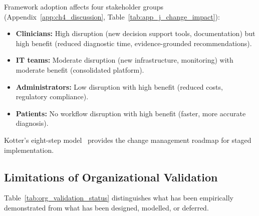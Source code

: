 Framework adoption affects four stakeholder groups (Appendix~\ref{app:ch4_discussion}, Table~\ref{tab:app_j_change_impact}):

\begin{itemize}
    \item \textbf{Clinicians:} High disruption (new decision support tools, documentation) but high benefit (reduced diagnostic time, evidence-grounded recommendations).
    \item \textbf{IT teams:} Moderate disruption (new infrastructure, monitoring) with moderate benefit (consolidated platform).
    \item \textbf{Administrators:} Low disruption with high benefit (reduced costs, regulatory compliance).
    \item \textbf{Patients:} No workflow disruption with high benefit (faster, more accurate diagnosis).
\end{itemize}

\noindent Kotter's eight-step model~\cite{kotter1996leading} provides the change management roadmap for staged implementation.

\subsection{Limitations of Organizational Validation}

Table~\ref{tab:org_validation_status} distinguishes what has been empirically demonstrated from what has been designed, modelled, or deferred.

